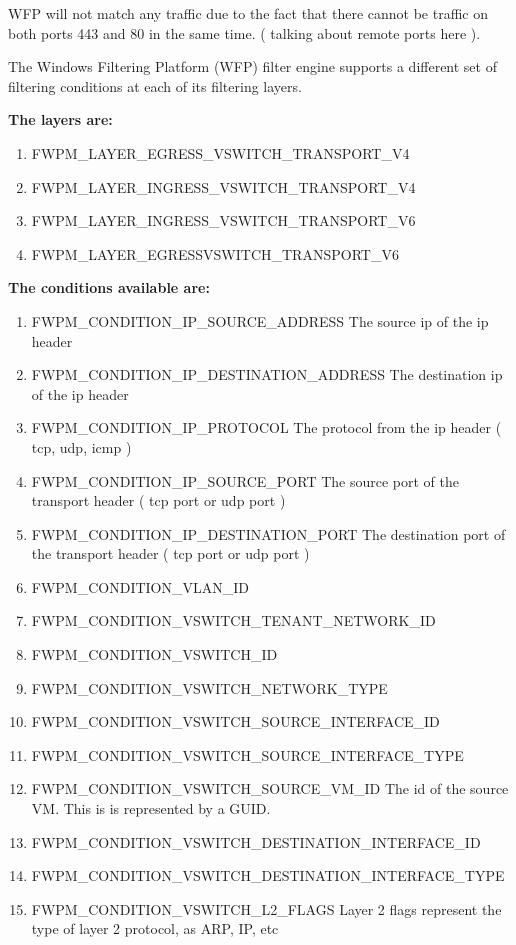 WFP will not match any traffic due to the fact that there cannot be traffic on both ports 443 and 80 in the same time. ( talking about remote ports here ).

\vspace{5mm}

The Windows Filtering Platform (WFP) filter engine supports a different set of filtering conditions at each of its filtering layers.

\vspace{5mm}

\textbf{The layers are: }

\begin{enumerate}
\item FWPM\_LAYER\_EGRESS\_VSWITCH\_TRANSPORT\_V4
\item FWPM\_LAYER\_INGRESS\_VSWITCH\_TRANSPORT\_V4
\item FWPM\_LAYER\_INGRESS\_VSWITCH\_TRANSPORT\_V6
\item FWPM\_LAYER\_EGRESSVSWITCH\_TRANSPORT\_V6
\end{enumerate}

\textbf{The conditions available are:}

\begin{enumerate}
\item FWPM\_CONDITION\_IP\_SOURCE\_ADDRESS
The source ip of the ip header
\item FWPM\_CONDITION\_IP\_DESTINATION\_ADDRESS
The destination ip of the ip header
\item FWPM\_CONDITION\_IP\_PROTOCOL
The protocol from the ip header ( tcp, udp, icmp )
\item FWPM\_CONDITION\_IP\_SOURCE\_PORT
The source port of the transport header ( tcp port or udp port )
\item FWPM\_CONDITION\_IP\_DESTINATION\_PORT
The destination port of the transport header ( tcp port or udp port )
\item FWPM\_CONDITION\_VLAN\_ID
\item FWPM\_CONDITION\_VSWITCH\_TENANT\_NETWORK\_ID
\item FWPM\_CONDITION\_VSWITCH\_ID
\item FWPM\_CONDITION\_VSWITCH\_NETWORK\_TYPE
\item FWPM\_CONDITION\_VSWITCH\_SOURCE\_INTERFACE\_ID
\item FWPM\_CONDITION\_VSWITCH\_SOURCE\_INTERFACE\_TYPE
\item FWPM\_CONDITION\_VSWITCH\_SOURCE\_VM\_ID
The id of the source VM. This is is represented by a GUID.
\item FWPM\_CONDITION\_VSWITCH\_DESTINATION\_INTERFACE\_ID
\item FWPM\_CONDITION\_VSWITCH\_DESTINATION\_INTERFACE\_TYPE
\item FWPM\_CONDITION\_VSWITCH\_L2\_FLAGS
Layer 2 flags represent the type of layer 2 protocol, as ARP, IP, etc
\end{enumerate}

